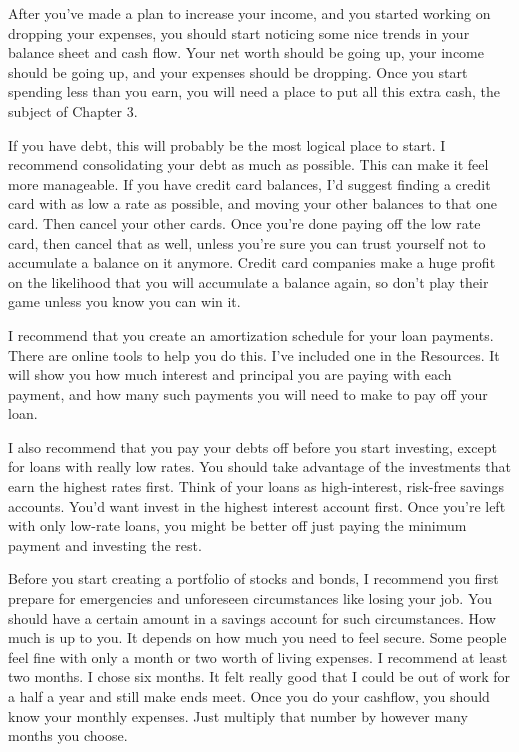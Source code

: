 After you've made a plan to increase your income, and you started working on dropping your expenses, you should start noticing some nice trends in your balance sheet and cash flow. Your net worth should be going up, your income should be going up, and your expenses should be dropping. Once you start spending less than you earn, you will need a place to put all this extra cash, the subject of Chapter 3.

If you have debt, this will probably be the most logical place to start. I recommend consolidating your debt as much as possible. This can make it feel more manageable. If you have credit card balances, I'd suggest finding a credit card with as low a rate as possible, and moving your other balances to that one card. Then cancel your other cards. Once you're done paying off the low rate card, then cancel that as well, unless you're sure you can trust yourself not to accumulate a balance on it anymore. Credit card companies make a huge profit on the likelihood that you will accumulate a balance again, so don't play their game unless you know you can win it.

I recommend that you create an amortization schedule for your loan payments. There are online tools to help you do this. I've included one in the Resources. It will show you how much interest and principal you are paying with each payment, and how many such payments you will need to make to pay off your loan.

I also recommend that you pay your debts off before you start investing, except for loans with really low rates. You should take advantage of the investments that earn the highest rates first. Think of your loans as high-interest, risk-free savings accounts. You'd want invest in the highest interest account first. Once you're left with only low-rate loans, you might be better off just paying the minimum payment and investing the rest.

Before you start creating a portfolio of stocks and bonds, I recommend you first prepare for emergencies and unforeseen circumstances like losing your job. You should have a certain amount in a savings account for such circumstances. How much is up to you. It depends on how much you need to feel secure. Some people feel fine with only a month or two worth of living expenses. I recommend at least two months. I chose six months. It felt really good that I could be out of work for a half a year and still make ends meet. Once you do your cashflow, you should know your monthly expenses. Just multiply that number by however many months you choose.

